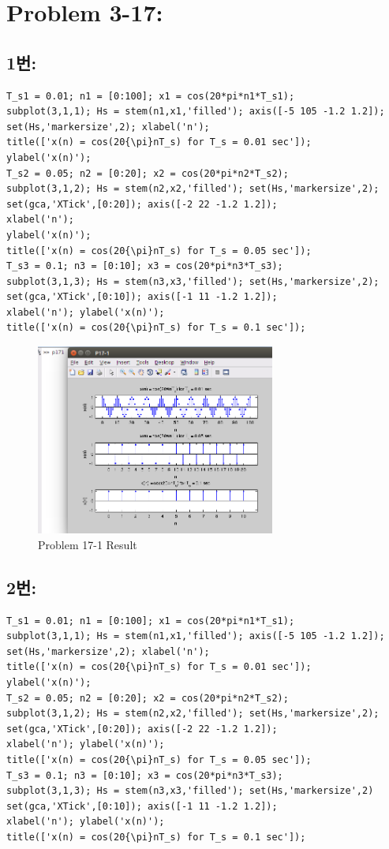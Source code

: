 \documentclass[11pt
  , a4paper
  , article
  , oneside
]{memoir}
\begin{document}
\chapter{Problem 3-17:}
\section{1번: }
\begin{lstlisting}[style=termstyle]
%Problem 3.17-1
T_s1 = 0.01; n1 = [0:100]; x1 = cos(20*pi*n1*T_s1);
subplot(3,1,1); Hs = stem(n1,x1,'filled'); axis([-5 105 -1.2 1.2]);
set(Hs,'markersize',2); xlabel('n');
title(['x(n) = cos(20{\pi}nT_s) for T_s = 0.01 sec']);
ylabel('x(n)');
T_s2 = 0.05; n2 = [0:20]; x2 = cos(20*pi*n2*T_s2);
subplot(3,1,2); Hs = stem(n2,x2,'filled'); set(Hs,'markersize',2);
set(gca,'XTick',[0:20]); axis([-2 22 -1.2 1.2]);
xlabel('n');
ylabel('x(n)');
title(['x(n) = cos(20{\pi}nT_s) for T_s = 0.05 sec']);
T_s3 = 0.1; n3 = [0:10]; x3 = cos(20*pi*n3*T_s3);
subplot(3,1,3); Hs = stem(n3,x3,'filled'); set(Hs,'markersize',2);
set(gca,'XTick',[0:10]); axis([-1 11 -1.2 1.2]);
xlabel('n'); ylabel('x(n)');
title(['x(n) = cos(20{\pi}nT_s) for T_s = 0.1 sec']);
\end{lstlisting}

\begin{figure}[h!]
	\centering
	\includegraphics[width=0.7\textwidth,height=0.4\textwidth]{./images/p17-1.png}
	\caption{Problem 17-1 Result}
	\label{fig:Problem 17-1 Result}
\end{figure}

\section{2번: }
\begin{lstlisting}[style=termstyle]
%Problem 3.17-2
T_s1 = 0.01; n1 = [0:100]; x1 = cos(20*pi*n1*T_s1);
subplot(3,1,1); Hs = stem(n1,x1,'filled'); axis([-5 105 -1.2 1.2]);
set(Hs,'markersize',2); xlabel('n');
title(['x(n) = cos(20{\pi}nT_s) for T_s = 0.01 sec']);
ylabel('x(n)');
T_s2 = 0.05; n2 = [0:20]; x2 = cos(20*pi*n2*T_s2);
subplot(3,1,2); Hs = stem(n2,x2,'filled'); set(Hs,'markersize',2);
set(gca,'XTick',[0:20]); axis([-2 22 -1.2 1.2]);
xlabel('n'); ylabel('x(n)');
title(['x(n) = cos(20{\pi}nT_s) for T_s = 0.05 sec']);
T_s3 = 0.1; n3 = [0:10]; x3 = cos(20*pi*n3*T_s3);
subplot(3,1,3); Hs = stem(n3,x3,'filled'); set(Hs,'markersize',2)
set(gca,'XTick',[0:10]); axis([-1 11 -1.2 1.2]);
xlabel('n'); ylabel('x(n)');
title(['x(n) = cos(20{\pi}nT_s) for T_s = 0.1 sec']);
\end{lstlisting}
\end{document}

